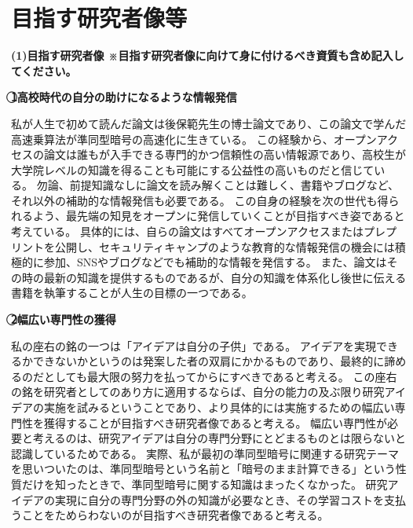 
\section{目指す研究者像等}

\noindent
\textbf{(1)目指す研究者像 {\footnotesize ※目指す研究者像に向けて身に付けるべき資質も含め記入してください。}}


\noindent\textbf{\textcircled{1}高校時代の自分の助けになるような情報発信}

私が人生で初めて読んだ論文は後保範先生の博士論文であり、この論文で学んだ高速乗算法が準同型暗号の高速化に生きている。
この経験から、オープンアクセスの論文は誰もが入手できる専門的かつ信頼性の高い情報源であり、高校生が大学院レベルの知識を得ることも可能にする公益性の高いものだと信じている。
勿論、前提知識なしに論文を読み解くことは難しく、書籍やブログなど、それ以外の補助的な情報発信も必要である。
この自身の経験を次の世代も得られるよう、最先端の知見をオープンに発信していくことが目指すべき姿であると考えている。
具体的には、自らの論文はすべてオープンアクセスまたはプレプリントを公開し、セキュリティキャンプのような教育的な情報発信の機会には積極的に参加、SNSやブログなどでも補助的な情報を発信する。
また、論文はその時の最新の知識を提供するものであるが、自分の知識を体系化し後世に伝える書籍を執筆することが人生の目標の一つである。

\noindent\textbf{\textcircled{2}幅広い専門性の獲得}

私の座右の銘の一つは「アイデアは自分の子供」である。
アイデアを実現できるかできないかというのは発案した者の双肩にかかるものであり、最終的に諦めるのだとしても最大限の努力を払ってからにすべきであると考える。
この座右の銘を研究者としてのあり方に適用するならば、自分の能力の及ぶ限り研究アイデアの実施を試みるということであり、より具体的には実施するための幅広い専門性を獲得することが目指すべき研究者像であると考える。
幅広い専門性が必要と考えるのは、研究アイデアは自分の専門分野にとどまるものとは限らないと認識しているためである。
実際、私が最初の準同型暗号に関連する研究テーマを思いついたのは、準同型暗号という名前と「暗号のまま計算できる」という性質だけを知ったときで、準同型暗号に関する知識はまったくなかった。
研究アイデアの実現に自分の専門分野の外の知識が必要なとき、その学習コストを支払うことをためらわないのが目指すべき研究者像であると考える。

